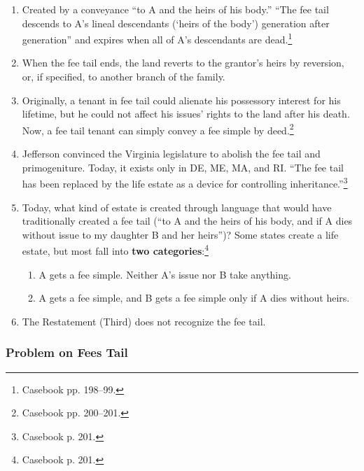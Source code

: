 \begin{enumerate}
    \item Created by a conveyance ``to A and the heirs of his 
    body.'' ``The fee tail descends to A's lineal descendants (`heirs of the 
    body') generation after generation'' and expires when all of A's 
    descendants are dead.\footnote{Casebook pp. 198--99.}
    \item When the fee tail ends, the land reverts to the grantor's heirs by 
    reversion, or, if specified, to another branch of the family.
    \item Originally, a tenant in fee tail could alienate his possessory 
    interest for his lifetime, but he could not affect his issues' rights to 
    the land after his death. Now, a fee tail tenant can simply convey a fee 
    simple by deed.\footnote{Casebook pp. 200--201.}
    \item Jefferson convinced the Virginia legislature to abolish the fee tail 
    and primogeniture. Today, it exists only in DE, ME, MA, and RI. ``The fee 
    tail has been replaced by the life estate as a device for controlling 
    inheritance.''\footnote{Casebook p. 201.}
    \item Today, what kind of estate is created through language that would 
    have traditionally created a fee tail (``to A and the heirs of his 
    body, and if A dies without issue to my daughter B and her heirs'')? Some 
    states create a life estate, but most fall into \textbf{two 
    categories}:\footnote{Casebook p. 201.}
    \begin{enumerate}
        \item A gets a fee simple. Neither A's issue nor B take anything.
        \item A gets a fee simple, and B gets a fee simple only if A dies 
        without heirs.
    \end{enumerate}
    \item The Restatement (Third) does not recognize the fee tail.
\end{enumerate}

\subsubsection{Problem on Fees Tail}

